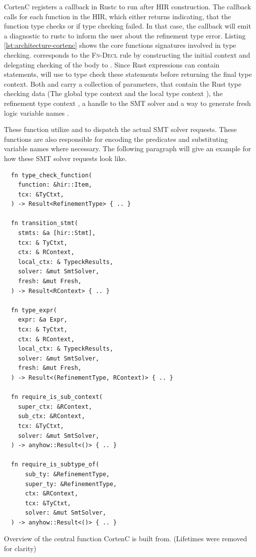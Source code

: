\documentclass[twoside, english]{sdqthesis}
\theoremstyle{definition}
\begin{document}
CortenC registers a callback in Rustc to run after HIR construction. The callback calls  for each function in the HIR, which either returns  indicating, that the function type checks or  if type checking failed. In that case, the callback will emit a diagnostic to rustc to inform the user about the refinement type error.
Listing \ref{lst:architecture-cortenc} shows the core functions signatures involved in type checking.  corresponds to the \textsc{Fn-Decl} rule by constructing the initial context and delegating checking of the body to . 
Since Rust expressions can contain statements,  will use  to type check these statements before returning the final type context.
Both  and  carry a collection of parameters, that contain the Rust type checking data (The global type context  and the local type context ), the refinement type context , a handle to the SMT solver  and a way to generate fresh logic variable names .

These function utilize  and  to dispatch the actual SMT solver requests. These functions are also responsible for encoding the predicates and substituting variable names where necessary. 
The following paragraph will give an example for how these SMT solver requests look like.

\begin{listing}[ht]
  \begin{verbatim}
  fn type_check_function(
    function: &hir::Item,
    tcx: &TyCtxt,
  ) -> Result<RefinementType> { .. }

  fn transition_stmt(
    stmts: &a [hir::Stmt],
    tcx: & TyCtxt,
    ctx: & RContext,
    local_ctx: & TypeckResults,
    solver: &mut SmtSolver,
    fresh: &mut Fresh,
  ) -> Result<RContext> { .. }

  fn type_expr(
    expr: &a Expr,
    tcx: & TyCtxt,
    ctx: & RContext,
    local_ctx: & TypeckResults,
    solver: &mut SmtSolver,
    fresh: &mut Fresh,
  ) -> Result<(RefinementType, RContext)> { .. }

  fn require_is_sub_context(
    super_ctx: &RContext,
    sub_ctx: &RContext,
    tcx: &TyCtxt,
    solver: &mut SmtSolver,
  ) -> anyhow::Result<()> { .. }

  fn require_is_subtype_of(
      sub_ty: &RefinementType,
      super_ty: &RefinementType,
      ctx: &RContext,
      tcx: &TyCtxt,
      solver: &mut SmtSolver,
  ) -> anyhow::Result<()> { .. }
  \end{verbatim}
  \caption{Overview of the central function CortenC is built from. (Lifetimes were removed for clarity)}
  \label{lst:architecture-cortenc}
\end{listing}
\end{document}
